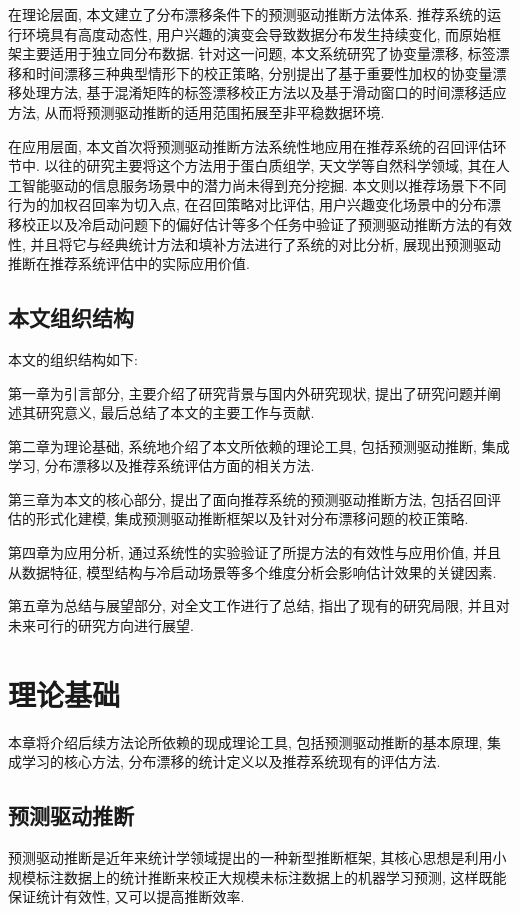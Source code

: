 \documentclass[a4paper, AutoFakeBold, UTF8]{ctexrep}
\theoremstyle{plain}
\numberwithin{equation}{chapter}
\begin{document}
在理论层面, 本文建立了分布漂移条件下的预测驱动推断方法体系. 推荐系统的运行环境具有高度动态性, 用户兴趣的演变会导致数据分布发生持续变化, 而原始框架主要适用于独立同分布数据. 针对这一问题, 本文系统研究了协变量漂移, 标签漂移和时间漂移三种典型情形下的校正策略, 分别提出了基于重要性加权的协变量漂移处理方法, 基于混淆矩阵的标签漂移校正方法以及基于滑动窗口的时间漂移适应方法, 从而将预测驱动推断的适用范围拓展至非平稳数据环境. 

在应用层面, 本文首次将预测驱动推断方法系统性地应用在推荐系统的召回评估环节中. 以往的研究主要将这个方法用于蛋白质组学, 天文学等自然科学领域, 其在人工智能驱动的信息服务场景中的潜力尚未得到充分挖掘. 本文则以推荐场景下不同行为的加权召回率为切入点, 在召回策略对比评估, 用户兴趣变化场景中的分布漂移校正以及冷启动问题下的偏好估计等多个任务中验证了预测驱动推断方法的有效性, 并且将它与经典统计方法和填补方法进行了系统的对比分析, 展现出预测驱动推断在推荐系统评估中的实际应用价值. 

\section{本文组织结构}

本文的组织结构如下: 

第一章为引言部分, 主要介绍了研究背景与国内外研究现状, 提出了研究问题并阐述其研究意义, 最后总结了本文的主要工作与贡献. 

第二章为理论基础, 系统地介绍了本文所依赖的理论工具, 包括预测驱动推断, 集成学习, 分布漂移以及推荐系统评估方面的相关方法. 

第三章为本文的核心部分, 提出了面向推荐系统的预测驱动推断方法, 包括召回评估的形式化建模, 集成预测驱动推断框架以及针对分布漂移问题的校正策略. 

第四章为应用分析, 通过系统性的实验验证了所提方法的有效性与应用价值, 并且从数据特征, 模型结构与冷启动场景等多个维度分析会影响估计效果的关键因素. 

第五章为总结与展望部分, 对全文工作进行了总结, 指出了现有的研究局限, 并且对未来可行的研究方向进行展望. 
\chapter{理论基础}

本章将介绍后续方法论所依赖的现成理论工具, 包括预测驱动推断的基本原理, 集成学习的核心方法, 分布漂移的统计定义以及推荐系统现有的评估方法. 
\section{预测驱动推断}
预测驱动推断是近年来统计学领域提出的一种新型推断框架, 其核心思想是利用小规模标注数据上的统计推断来校正大规模未标注数据上的机器学习预测, 这样既能保证统计有效性, 又可以提高推断效率. 
\end{document}
